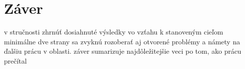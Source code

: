 \chapter*{Záver}  %














 v stručnosti zhrnúť dosiahnuté výsledky vo vzťahu k stanoveným cieľom
minimálne dve strany
sa zvyknú rozoberať aj otvorené problémy a námety na ďalšiu prácu v oblasti.
záver sumarizuje najdôležitejšie veci po tom, ako prácu prečítal